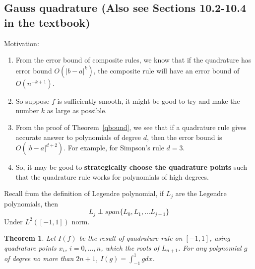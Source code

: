 \documentclass{article} %
\theoremstyle{break}
\newtheorem{thm}[definition]{Theorem}
\begin{document}
  \subsection{Gauss quadrature (Also see Sections 10.2-10.4 in the textbook)}
  Motivation:
  \begin{enumerate}
  \item From the error bound of composite rules, we know that if the quadrature has error bound $O(|b-a|^k)$, the composite rule will have an error bound of $O(n^{-k+1})$.
  \item So suppose $f$ is sufficiently smooth, it might be good to try and make the number $k$ as large as possible.
  \item From the proof of Theorem~\ref{qbound}, we see that if a quadrature rule gives accurate answer to polynomials of degree $d$, then the error bound is $O(|b-a|^{d+2})$. For example, for Simpson's rule $d=3$. 
  \item So, it may be good to {\bf strategically choose the quadrature points} such that the quadrature rule works for polynomials of high degrees. 
  \end{enumerate}

  Recall from the definition of Legendre polynomial, if $L_j$ are the Legendre polynomials, then
  \[L_j\perp span\{L_0, L_1, \dots L_{j-1}\}\]
  Under $L^2([-1, 1])$ norm.\\


  \begin{thm}\label{high_poly} Let $I(f)$ be the result of quadrature rule on $[-1, 1]$, using quadrature points  $x_i$, $i=0, \dots, n$, which the roots of $L_{n+1}$. For any polynomial $g$ of degree no more than $2n+1$, $I(g)=\int_{-1}^1gdx$.\end{thm}
\end{document}
